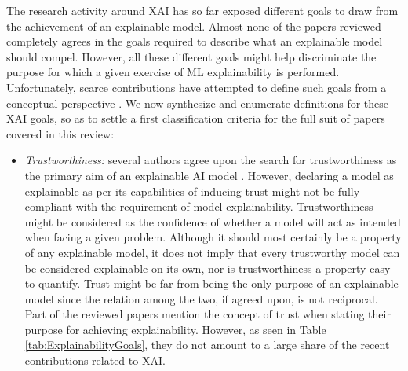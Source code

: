 \documentclass[final]{elsarticle}
\begin{document}
The research activity around XAI has so far exposed different goals to draw from the achievement of an explainable model. Almost none of the papers reviewed completely agrees in the goals required to describe what an explainable model should compel. However, all these different goals might help discriminate the purpose for which a given exercise of ML explainability is performed. Unfortunately, scarce contributions have attempted to define such goals from a conceptual perspective \cite{Lipton18,Gilpin18,WhatDoesExplainableAImean,WhatDoWeNeed}. We now synthesize and enumerate definitions for these XAI goals, so as to settle a first classification criteria for the full suit of papers covered in this review:
\begin{itemize}[leftmargin=*]
    \item \textit{Trustworthiness:} several authors agree upon the search for trustworthiness as the primary aim of an explainable AI model \cite{kim2015Trust,ribeiro2016trust}. However, declaring a model as explainable as per its capabilities of inducing trust might not be fully compliant with the requirement of model explainability. Trustworthiness might be considered as the confidence of whether a model will act as intended when facing a given problem. Although it should most certainly be a property of any explainable model, it does not imply that every trustworthy model can be considered explainable on its own, nor is trustworthiness a property easy to quantify. Trust might be far from being the only purpose of an explainable model since the relation among the two, if agreed upon, is not reciprocal. Part of the reviewed papers mention the concept of trust when stating their purpose for achieving explainability. However, as seen in Table \ref{tab:ExplainabilityGoals}, they do not amount to a large share of the recent contributions related to XAI. 
\begin{table}[t]
	\centering
\end{table}
\end{itemize}
\end{document}
